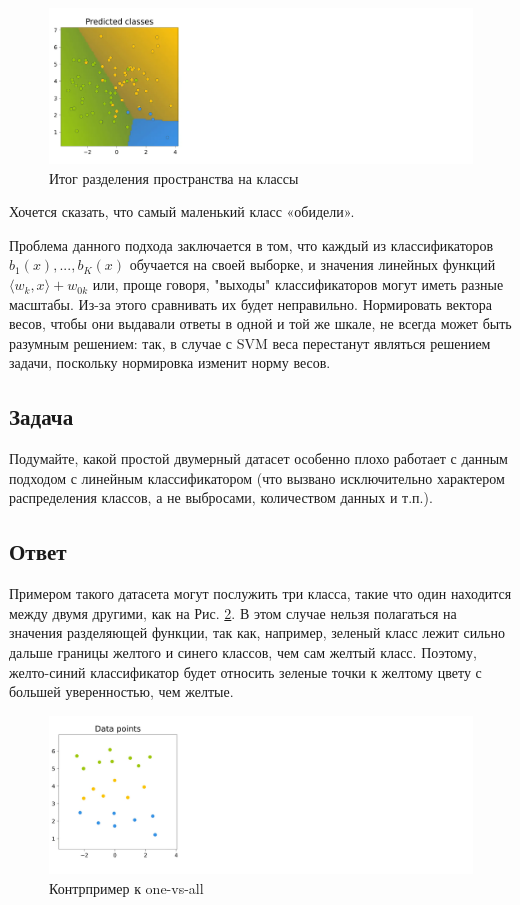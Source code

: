 \begin{itemize}
\begin{figure}[H]
	\centering
	\includegraphics[width=0.8\linewidth]{chapters/linear/pics/multi-ova-final.png}
	\caption{Итог разделения пространства на классы}
	\label{fig:linear-multi-ova-final}
\end{figure}

Хочется сказать, что самый маленький класс «обидели».

Проблема данного подхода заключается в том, что каждый из классификаторов $b_1(x),...,b_K(x)$ обучается на своей выборке, и значения линейных функций $\langle w_k, x \rangle+w_{0k}$ или, проще говоря, "выходы" классификаторов могут иметь разные масштабы. Из-за этого сравнивать их будет неправильно. Нормировать вектора весов, чтобы они выдавали ответы в одной и той же шкале, не всегда может быть разумным решением: так, в случае с SVM веса перестанут являться решением задачи, поскольку нормировка изменит норму весов.

\subsection*{Задача}

Подумайте, какой простой двумерный датасет особенно плохо работает с данным подходом с линейным классификатором (что вызвано исключительно характером распределения классов, а не выбросами, количеством данных и т.п.).

\subsection*{Ответ}

Примером такого датасета могут послужить три класса, такие что один находится между двумя другими, как на Рис. \ref{fig:linear-multi-ova-contrprimer}. В этом случае нельзя полагаться на значения разделяющей функции, так как, например, зеленый класс лежит сильно дальше границы желтого и синего классов, чем сам желтый класс. Поэтому, желто-синий классификатор будет относить зеленые точки к желтому цвету с большей уверенностью, чем желтые.

\begin{figure}[H]
	\centering
	\includegraphics[width=0.8\linewidth]{chapters/linear/pics/multi-ova-contrprimer.png}
	\caption{Контрпример к one-vs-all}
	\label{fig:linear-multi-ova-contrprimer}
\end{figure}


\end{itemize}
